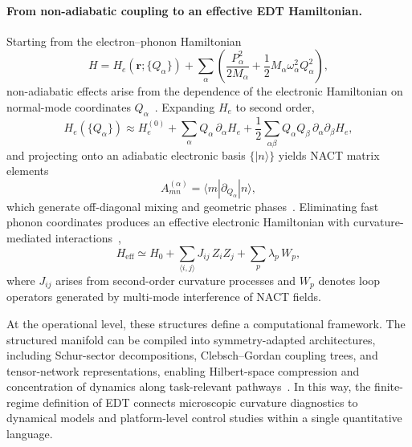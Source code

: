 \paragraph*{From non-adiabatic coupling to an effective EDT Hamiltonian.}

Starting from the electron--phonon Hamiltonian
\begin{equation}
H = H_e(\mathbf{r};\{Q_\alpha\}) + \sum_\alpha \left(\frac{P_\alpha^2}{2M_\alpha} + \frac{1}{2} M_\alpha \omega_\alpha^2 Q_\alpha^2\right),
\end{equation}
non-adiabatic effects arise from the dependence of the electronic Hamiltonian on normal-mode coordinates $Q_\alpha$~\cite{BornOppenheimer1927,Mead1979,Yarkony1996}. Expanding $H_e$ to second order,
\begin{equation}
H_e(\{Q_\alpha\}) \approx H_e^{(0)} + \sum_\alpha Q_\alpha \,\partial_\alpha H_e + \frac{1}{2}\sum_{\alpha\beta} Q_\alpha Q_\beta \,\partial_\alpha \partial_\beta H_e,
\end{equation}
and projecting onto an adiabatic electronic basis $\{|n\rangle\}$ yields NACT matrix elements
\begin{equation}
A^{(\alpha)}_{mn} = \langle m | \partial_{Q_\alpha} | n \rangle,
\end{equation}
which generate off-diagonal mixing and geometric phases~\cite{Berry1984}. Eliminating fast phonon coordinates produces an effective electronic Hamiltonian with curvature-mediated interactions~\cite{SchriefferWolff1966,LangFirsov1962},
\begin{equation}
H_{\mathrm{eff}} \simeq H_0 + \sum_{\langle i,j\rangle} J_{ij}\, Z_i Z_j + \sum_p \lambda_p\, W_p,
\end{equation}
where $J_{ij}$ arises from second-order curvature processes and $W_p$ denotes loop operators generated by multi-mode interference of NACT fields.

At the operational level, these structures define a computational framework. The structured manifold can be compiled into symmetry-adapted architectures, including Schur-sector decompositions, Clebsch--Gordan coupling trees, and tensor-network representations, enabling Hilbert-space compression and concentration of dynamics along task-relevant pathways~\cite{Bacon2006}. In this way, the finite-regime definition of EDT connects microscopic curvature diagnostics to dynamical models and platform-level control studies within a single quantitative language.

